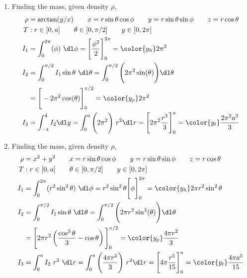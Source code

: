 \begin{enumerate}
    \item Finding the mass, given density $ \rho $,
          \begin{align}
              \rho & = \arctan(y/x) \qquad x = r\sin \theta \cos \phi
              \qquad y = r\sin \theta \sin \phi \qquad z = r \cos \theta              \\
              T    & : r \in [0, a] \qquad \theta \in [0, \pi/2]
              \qquad y \in [0, 2\pi]                                                  \\
              I_1  & = \int_{0}^{2\pi} (\phi)
              \ \dl \phi
              = \Bigg[ \frac{\phi^2}{2} \Bigg]_{0}^{2\pi}
              = {\color{y_h} 2\pi^2}                                                  \\
              I_2  & = \int_{0}^{\pi/2}I_1 \sin \theta\ \dl \theta = \int_{0}^{\pi/2}
              \Bigg( 2\pi^2 \sin(\theta) \Bigg) \dl \theta                            \\
                   & = \Bigg[  -2\pi^2 \cos(\theta) \Bigg]_{0}^{\pi/2}
              = {\color{y_p} 2\pi^2 }                                                 \\
              I_3  & = \int_{-4}^{4} I_2 \dl y = \int_{0}^{a}
              \Bigg( 2\pi^2 \Bigg)\ r^2 \dl r
              = \Bigg[ 2\pi^2 \frac{r^3}{3} \Bigg]_{0}^{a}
              = {\color{y_t} \frac{2\pi^2a^3}{3}}
          \end{align}

    \item Finding the mass, given density $ \rho $,
          \begin{align}
              \rho & = x^2 + y^2 \qquad x = r\sin \theta \cos \phi
              \qquad y = r\sin \theta \sin \phi \qquad z = r \cos \theta              \\
              T    & : r \in [0, a] \qquad \theta \in [0, \pi/2]
              \qquad y \in [0, 2\pi]                                                  \\
              I_1  & = \int_{0}^{2\pi} (r^2 \sin^2 \theta)
              \ \dl \phi
              = r^2 \sin^2 \theta \Bigg[ \phi \Bigg]_{0}^{2\pi}
              = {\color{y_h} 2\pi r^2 \sin^2 \theta}                                  \\
              I_2  & = \int_{0}^{\pi/2}I_1 \sin \theta\ \dl \theta = \int_{0}^{\pi/2}
              \Bigg( 2\pi r^2 \sin^3(\theta) \Bigg) \dl \theta                        \\
                   & = \Bigg[ 2\pi r^2 \left( \frac{\cos^3 \theta}{3}
                  - \cos \theta \right) \Bigg]_{0}^{\pi/2}
              = {\color{y_p} \frac{4\pi r^2}{3} }                                     \\
              I_3  & = \int_{0}^{a} I_2\ r^2\ \dl r = \int_{0}^{a}
              \Bigg( \frac{4\pi r^2}{3} \Bigg)\ r^2 \dl r
              = \Bigg[ 4\pi \frac{r^5}{15} \Bigg]_{0}^{a}
              = {\color{y_t} \frac{4\pi a^5}{15}}
          \end{align}


\end{enumerate}

